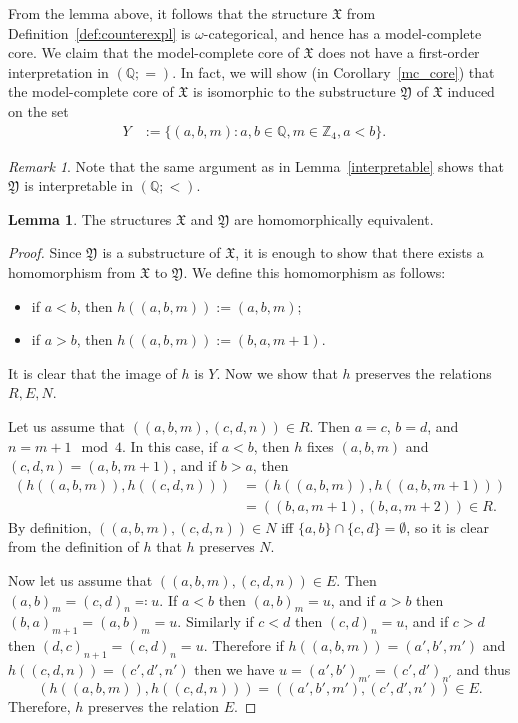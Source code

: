\documentclass{amsart}
\theoremstyle{definition}
\newtheorem{lemma}[theorem]{Lemma}
\theoremstyle{remark}
\newtheorem{remark}[theorem]{Remark}
\numberwithin{equation}{section}
\newcommand{\mZ}{\mathbb Z}
\newcommand{\atoms}{({\mathbb Q};=)}
\newcommand{\order}{(\mathbb{Q};<)}
\newcommand{\fx}{\mathfrak{X}}
\newcommand{\fy}{\mathfrak{Y}}
\begin{document}
	From the lemma above, it follows that the structure $\fx$ from Definition~\ref{def:counterexpl} is $\omega$-categorical, and hence has a model-complete core. We claim that the model-complete core of $\fx$ does not have a first-order interpretation in  $\atoms$. In fact, we will show (in Corollary~\ref{mc_core}) that the model-complete core of $\fx$ is isomorphic to the substructure $\fy$ of $\fx$ induced on the set 
\begin{align}
    Y & :=\{(a,b,m): a,b\in \mathbb{Q}, m\in \mZ_4, a< b\}. & \label{eq:B}
\end{align}

\begin{remark}\label{z_inter_q}
	Note that the same argument as in Lemma~\ref{interpretable} shows that $\fy$ is interpretable in $\order$.
\end{remark}

\begin{lemma}\label{hom_equiv}
	The structures $\fx$ and $\fy$ are homomorphically equivalent.
\end{lemma}

\begin{proof}
	Since $\fy$ is a substructure of $\fx$, it is enough to show that there exists a homomorphism from $\fx$ to $\fy$. We define this homomorphism as follows: 
\begin{itemize}
\item if $a<b$, then $h((a,b,m)):=(a,b,m)$; 
\item if $a>b$, then $h((a,b,m)):=(b,a,m+1)$.
\end{itemize}
	It is clear that the image of $h$ is {$Y$}. Now we show that $h$ preserves the relations $R,E,N$.

	Let us assume that $((a,b,m),(c,d,n))\in R$. Then $a=c$, $b=d$, and ${n=m+1} \mod 4$. In this case, if $a<b$, then $h$ fixes $(a,b,m)$ and $(c,d,n)=(a,b,m+1)$, and if $b>a$, then 
\begin{align*}
(h((a,b,m)),h((c,d,n))) & =(h((a,b,m)),h((a,b,m+1))) \\
& = ((b,a,m+1),(b,a,m+2))\in R.
\end{align*}
	By definition, $((a,b,m),(c,d,n))\in N$ iff $\{a,b\}\cap \{c,d\}=\emptyset$, so it is clear from the definition of $h$ that $h$ preserves $N$.

	Now let us assume that $((a,b,m),(c,d,n))\in E$. Then $(a,b)_m=(c,d)_n\eqqcolon u$. If $a<b$ then $(a,b)_m=u$, and if $a>b$ then $(b,a)_{m+1}=(a,b)_m=u$. Similarly if $c<d$ then $(c,d)_n=u$, and if ${c>d}$ then $(d,c)_{n+1}=(c,d)_n=u$. Therefore if $h((a,b,m))=(a',b',m')$ and $h((c,d,n))=(c',d',n')$ then we have $u=(a',b')_{m'}=(c',d')_{n'}$ and thus $$(h((a,b,m)),h((c,d,n)))=((a',b',m'),(c',d',n'))\in E.$$ Therefore, $h$ preserves the relation $E$.
\end{proof}
\end{document}
